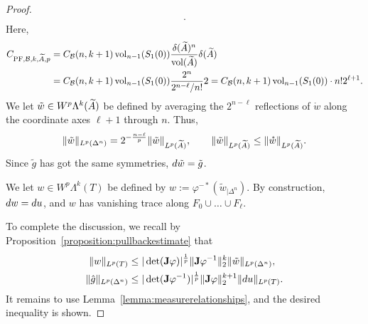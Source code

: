 \documentclass[10pt,a4paper]{article}
\begin{document}
\begin{proof}
\begin{align}
        .
    \end{align}
    Here,
    \begin{align*}
        C_{{{\rm PF}},{\mathcal B},k,\widetilde {A},p} 
        &
        = 
        C_{{\mathcal B}}(n,k+1) \operatorname{vol}_{n-1}(S_{1}(0)) \frac{{\delta}(\widetilde {A})^{n}}{\operatorname{vol}(\widetilde {A})} {\delta}(\widetilde {A})
        \\&
        = 
        C_{{\mathcal B}}(n,k+1) \operatorname{vol}_{n-1}(S_{1}(0)) \frac{2^{n}}{2^{n-\ell}/n!} 2
        = 
        C_{{\mathcal B}}(n,k+1) \operatorname{vol}_{n-1}(S_{1}(0)) \cdot n! 2^{\ell+1} 
        .
    \end{align*}
    We let $\tilde w \in W^{p}\Lambda^{k}(\widetilde {A})$ be defined by averaging the $2^{n - \ell}$ reflections of $\mathring w$ along the coordinate axes $\ell+1$ through $n$. Thus,
    \begin{align*}
        \| \tilde w \|_{L^{p}(\Delta^{n})}
        =
        2^{-\frac{n-\ell}{p}}
        \| \tilde w \|_{L^{p}(\widetilde {A})}
        ,
        \qquad 
        \| \tilde w \|_{L^{p}(\widetilde {A})}
        \leq 
        \| \mathring w \|_{L^{p}(\widetilde {A})}
        .
    \end{align*}
    Since $\tilde g$ has got the same symmetries, $d \tilde w = \tilde g$.
    
    We let $w \in W^{p}\Lambda^{k}(T)$ be defined by $w := \varphi^{-\ast} ( \tilde w_{|\Delta^n} )$.
    By construction, $d w = d u$,
    and $w$ has vanishing trace along $F_{0} \cup \dots \cup F_{\ell}$.
    
    To complete the discussion, we recall by Proposition~\ref{proposition:pullbackestimate} that 
    \begin{align*}
        \| w \|_{L^{p}(T)}
        &\leq 
        |\det({\mathbf{J}} \varphi)|^{\frac 1 p} 
        \|  {\mathbf{J}} \varphi^{-1}  \|_{2}^{k}
        \| \tilde w \|_{L^{p}(\Delta^n)}
        ,
        \\
        \| \hat g \|_{L^{p}(\Delta^n)}
        &\leq 
        |\det( {\mathbf{J}} \varphi^{-1} )|^{\frac 1 p} 
        \| {\mathbf{J}} \varphi \|_{2}^{k+1}
        \| d u \|_{L^{p}(T)}
        .
    \end{align*}
    It remains to use Lemma~\ref{lemma:measurerelationships}, and the desired inequality is shown. 
\end{proof}
\end{document}
